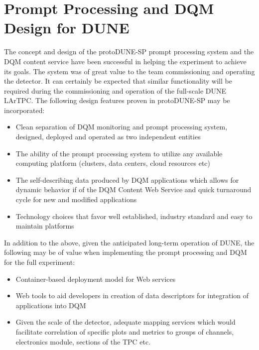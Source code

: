 \documentclass[pdftex,12pt,letter]{article}
\newcommand{\pd}{protoDUNE\xspace}
\begin{document}
\section{Prompt Processing and DQM Design for DUNE}

The concept and design of the \pd-SP prompt processing system and the DQM content
service have been successful in helping the experiment to achieve its goals. The system
was of great value to the team commissioning and operating the detector. It can certainly
be expected that similar functionality will be required during the commissioning
and operation of the full-scale DUNE LArTPC. The following design features proven in
\pd-SP may be incorporated:
\begin{itemize}
\item Clean separation of DQM monitoring and prompt processing system, designed, deployed and operated as two independent entities

\item The ability of the prompt processing system to utilize any available computing
platform (clusters, data centers, cloud resources etc)

\item The self-describing data produced by DQM applications which allows for dynamic
behavior if of the DQM Content Web Service and quick turnaround cycle for new and
modified applications

\item Technology choices that favor well established, industry standard and easy to maintain
platforms

\end{itemize}

\noindent In addition to the above, given the anticipated long-term operation of DUNE, the following
may be of value when implementing the prompt processing and DQM for the full experiment:

\begin{itemize}

\item Container-based deployment model for Web services

\item Web tools to aid developers in creation of data descriptors for integration of applications into DQM

\item Given the scale of the detector, adequate mapping services which would facilitate correlation
of specific plots and metrics to groups of channels, electronics module, sections of the TPC etc.

\end{itemize}
\end{document}
